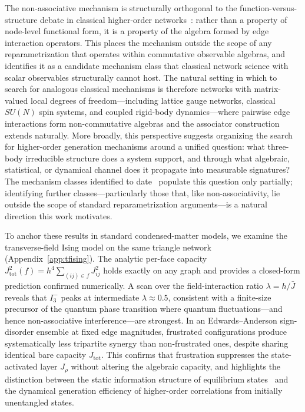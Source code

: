 \documentclass[aps,physrev,preprint,groupedaddress]{revtex4-2}
\begin{document}
The non-associative mechanism is structurally orthogonal to the function-versus-structure debate in classical higher-order networks~\cite{peixoto2026GraphsAre}: rather than a property of node-level functional form, it is a property of the algebra formed by edge interaction operators. This places the mechanism outside the scope of any reparametrization that operates within commutative observable algebras, and identifies it as a candidate mechanism class that classical network science with scalar observables structurally cannot host. The natural setting in which to search for analogous classical mechanisms is therefore networks with matrix-valued local degrees of freedom—including lattice gauge networks, classical $SU(N)$ spin systems, and coupled rigid-body dynamics—where pairwise edge interactions form non-commutative algebras and the associator construction extends naturally. More broadly, this perspective suggests organizing the search for higher-order generation mechanisms around a unified question: what three-body irreducible structure does a system support, and through what algebraic, statistical, or dynamical channel does it propagate into measurable signatures? The mechanism classes identified to date~\cite{caprioglio2026SynergisticMotifs, robiglio2025SynergisticSignatures, nijholt2022EmergentHypernetworks} populate this question only partially; identifying further classes—particularly those that, like non-associativity, lie outside the scope of standard reparametrization arguments—is a natural direction this work motivates.

To anchor these results in standard condensed-matter models, we examine the transverse-field Ising model on the same triangle network (Appendix~\ref{app:tfising}). The analytic per-face capacity $J_{\mathrm{tot}}^2(f) = h^4 \sum_{(ij) \in f} J_{ij}^2$ holds exactly on any graph and provides a closed-form prediction confirmed numerically. A scan over the field-interaction ratio $\lambda = h/\bar{J}$ reveals that $I_3^-$ peaks at intermediate $\lambda \approx 0.5$, consistent with a finite-size precursor of the quantum phase transition where quantum fluctuations—and hence non-associative interference—are strongest. In an Edwards–Anderson sign-disorder ensemble at fixed edge magnitudes, frustrated configurations produce systematically less tripartite synergy than non-frustrated ones, despite sharing identical bare capacity $J_{\mathrm{tot}}$. This confirms that frustration suppresses the state-activated layer $J_\rho$ without altering the algebraic capacity, and highlights the distinction between the static information structure of equilibrium states~\cite{marinazzo2019SynergyWarning} and the dynamical generation efficiency of higher-order correlations from initially unentangled states.
\end{document}
